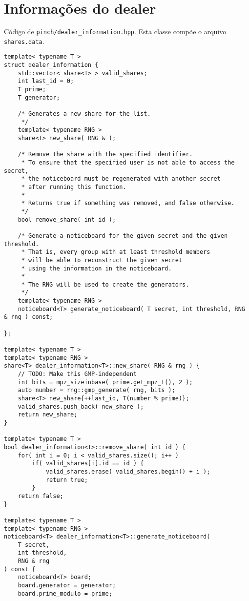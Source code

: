 \documentclass[10pt]{article}
\begin{document}
\section{Informações do dealer}

Código de \verb"pinch/dealer_information.hpp".
Esta classe compõe o arquivo \verb"shares.data".

\begin{verbatim}
template< typename T >
struct dealer_information {
    std::vector< share<T> > valid_shares;
    int last_id = 0;
    T prime;
    T generator;

    /* Generates a new share for the list.
     */
    template< typename RNG >
    share<T> new_share( RNG & );

    /* Remove the share with the specified identifier.
     * To ensure that the specified user is not able to access the secret,
     * the noticeboard must be regenerated with another secret
     * after running this function.
     *
     * Returns true if something was removed, and false otherwise.
     */
    bool remove_share( int id );

    /* Generate a noticeboard for the given secret and the given threshold.
     * That is, every group with at least threshold members
     * will be able to reconstruct the given secret
     * using the information in the noticeboard.
     *
     * The RNG will be used to create the generators.
     */
    template< typename RNG >
    noticeboard<T> generate_noticeboard( T secret, int threshold, RNG & rng ) const;

};

template< typename T >
template< typename RNG >
share<T> dealer_information<T>::new_share( RNG & rng ) {
    // TODO: Make this GMP-independent
    int bits = mpz_sizeinbase( prime.get_mpz_t(), 2 );
    auto number = rng::gmp_generate( rng, bits );
    share<T> new_share{++last_id, T(number % prime)};
    valid_shares.push_back( new_share );
    return new_share;
}

template< typename T >
bool dealer_information<T>::remove_share( int id ) {
    for( int i = 0; i < valid_shares.size(); i++ )
        if( valid_shares[i].id == id ) {
            valid_shares.erase( valid_shares.begin() + i );
            return true;
        }
    return false;
}

template< typename T >
template< typename RNG >
noticeboard<T> dealer_information<T>::generate_noticeboard(
    T secret,
    int threshold,
    RNG & rng
) const {
    noticeboard<T> board;
    board.generator = generator;
    board.prime_modulo = prime;


\end{verbatim}
\end{document}
